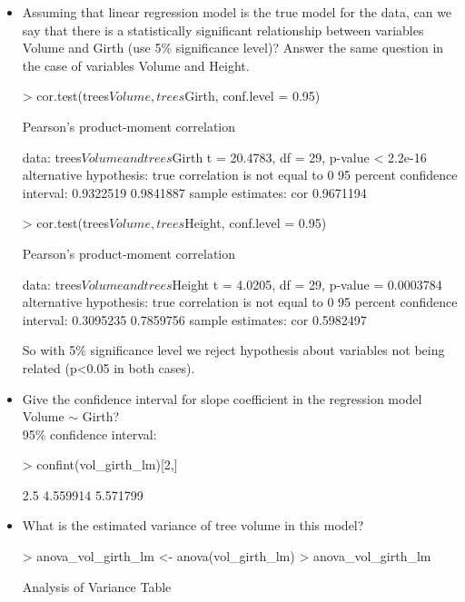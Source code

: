 \documentclass[a4paper]{article}
\begin{document}
\begin{itemize}
\item Assuming that linear regression model is the true model for the data, can we say that there is a statistically significant relationship between variables Volume and Girth (use 5\% significance level)? Answer the same question in the case of variables Volume and Height.
\begin{Schunk}
\begin{Sinput}
> cor.test(trees$Volume,trees$Girth, conf.level = 0.95)
\end{Sinput}
\begin{Soutput}
	Pearson's product-moment correlation

data:  trees$Volume and trees$Girth
t = 20.4783, df = 29, p-value < 2.2e-16
alternative hypothesis: true correlation is not equal to 0
95 percent confidence interval:
 0.9322519 0.9841887
sample estimates:
      cor 
0.9671194 
\end{Soutput}
\begin{Sinput}
> cor.test(trees$Volume,trees$Height, conf.level = 0.95)
\end{Sinput}
\begin{Soutput}
	Pearson's product-moment correlation

data:  trees$Volume and trees$Height
t = 4.0205, df = 29, p-value = 0.0003784
alternative hypothesis: true correlation is not equal to 0
95 percent confidence interval:
 0.3095235 0.7859756
sample estimates:
      cor 
0.5982497 
\end{Soutput}
\end{Schunk}
So with 5\% significance level we reject hypothesis about variables not being related (p\textless 0.05 in both cases). 

\item Give the confidence interval for slope coefficient in the regression model Volume $\sim$ Girth?
\\

95\% confidence interval:
\begin{Schunk}
\begin{Sinput}
> confint(vol_girth_lm)[2,]
\end{Sinput}
\begin{Soutput}
   2.5 %   97.5 % 
4.559914 5.571799 
\end{Soutput}
\end{Schunk}

\item What is the estimated variance of tree volume in this model?
\begin{Schunk}
\begin{Sinput}
> anova_vol_girth_lm <- anova(vol_girth_lm)
> anova_vol_girth_lm
\end{Sinput}
\begin{Soutput}
Analysis of Variance Table


\end{Soutput}
\end{Schunk}
\end{itemize}
\end{document}
